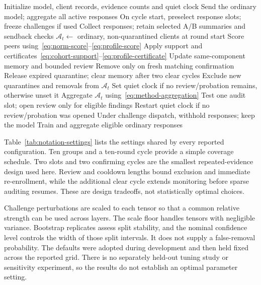 \documentclass[journal]{IEEEtran}
\makeatletter
\renewcommand{\subsection}{\@startsection{subsection}{2}{\z@}{1.5ex}{0.7ex}{\normalfont\normalsize\itshape}}
\makeatother
\begin{document}
\begin{algorithm}[t]
\caption{Training with paired confirmation and bounded review}\label{alg:overall}
\begin{algorithmic}[1]\small
\State Initialize model, client records, evidence counts and quiet clock
  \State Send the ordinary model; aggregate all active responses
  \State On cycle start, preselect response slots; freeze challenges if used
  \State Collect responses; retain selected A/B summaries and sendback checks
  \State $\mathcal A_t\gets$ ordinary, non-quarantined clients at round start
   \State Score peers using~\eqref{eq:norm-score}--\eqref{eq:profile-score}
   \State Apply support and certificates~\eqref{eq:cohort-support}--\eqref{eq:profile-certificate}
   \State Update same-component memory and bounded review
   \State Remove only on fresh matching confirmation
   \State Release expired quarantine; clear memory after two clear cycles
   \State Exclude new quarantines and removals from $\mathcal A_t$
   \State Set quiet clock if no review/probation remains, otherwise unset it
  \EndIf
  \State Aggregate $\mathcal A_t$ using~\eqref{eq:method-aggregation}
  \State Test one audit slot; open review only for eligible findings
  \State Restart quiet clock if no review/probation was opened
  \State Under challenge dispatch, withhold responses; keep the model
 \Else
  \State Train and aggregate eligible ordinary responses
 \EndIf
\EndFor
\end{algorithmic}
\end{algorithm}

\subsection{Choice of Protocol Settings}
Table~\ref{tab:notation-settings} lists the settings shared by every
reported configuration. Ten groups and a ten-round cycle provide a simple
coverage schedule. Two slots and two confirming cycles are the
smallest repeated-evidence design used here. Review and cooldown lengths
bound exclusion and immediate re-enrollment, while the additional clear
cycle extends monitoring before sparse auditing resumes. These are design tradeoffs,
not statistically optimal choices.

Challenge perturbations are scaled to each tensor so that a common relative
strength can be used across layers. The scale floor handles tensors with
negligible variance. Bootstrap replicates assess split stability, and
the nominal confidence level controls the width of those split intervals.
It does not supply a false-removal probability. The defaults were adopted
during development and then held fixed across the reported grid. There
is no separately held-out tuning study or sensitivity experiment, so
the results do not establish an optimal parameter setting.
\end{document}
